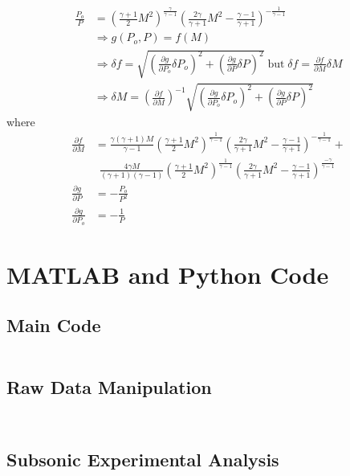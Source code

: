 \documentclass[runningheads]{llncs}
\begin{document}
\begin{align*}
    \frac{P_o}{P} &= \left(\frac{\gamma + 1}{2}M^2\right)^{\frac{\gamma}{\gamma - 1}}\left(\frac{2\gamma}{\gamma + 1}M^2 - \frac{\gamma - 1}{\gamma + 1}\right)^{-\frac{1}{\gamma - 1}} \\
    &\Rightarrow g(P_o, P) = f(M) \\
    &\Rightarrow \delta f = \sqrt{\left(\frac{\partial g}{\partial P_o}\delta P_o\right)^2 + \left(\frac{\partial g}{\partial P}\delta P\right)^2}\;\text{but}\;\delta f = \frac{\partial f}{\partial M} \delta M \\
    &\Rightarrow \delta M = \left(\frac{\partial f}{\partial M}\right)^{-1}\sqrt{\left(\frac{\partial g}{\partial P_o}\delta P_o\right)^2 + \left(\frac{\partial g}{\partial P}\delta P\right)^2}
\end{align*}
where
\begin{align*}
    \frac{\partial f}{\partial M} &= \frac{\gamma (\gamma + 1) M}{\gamma - 1}\left(\frac{\gamma + 1}{2}M^2\right)^\frac{1}{\gamma - 1}\left(\frac{2\gamma}{\gamma + 1}M^2 - \frac{\gamma - 1}{\gamma + 1}\right)^{-\frac{1}{\gamma - 1}} + \\ & \ \ \frac{4\gamma M}{(\gamma + 1)(\gamma - 1)}\left(\frac{\gamma + 1}{2}M^2\right)^\frac{1}{\gamma - 1}\left(\frac{2\gamma}{\gamma + 1}M^2 - \frac{\gamma - 1}{\gamma + 1}\right)^{\frac{-\gamma}{\gamma - 1}} \\
    \frac{\partial g}{\partial P} &= -\frac{P_o}{P^2} \\
    \frac{\partial g}{\partial P_o} &= -\frac{1}{P}
\end{align*}

\newpage
\section{MATLAB and Python Code}

\subsection{Main Code}

\inputminted{matlab}{code/main.m}

\subsection{Raw Data Manipulation}
\inputminted{matlab}{code/get_pressures.m}
\inputminted{matlab}{code/get_uncertainties.m}

\subsection{Subsonic Experimental Analysis}
\end{document}
